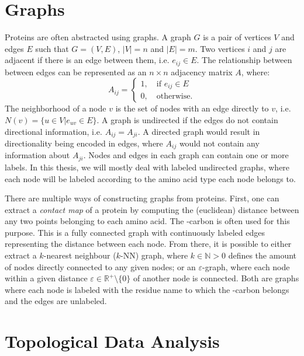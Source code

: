 \section{Graphs}\label{sec:graphs}

Proteins are often abstracted using graphs. A graph $G$ is a pair of vertices
$V$ and edges $E$ such that $G=(V, E)$, $|V|=n$ and $|E|=m$. Two vertices $i$
and $j$ are adjacent if there is an edge between them, i.e. $e_{ij}\in E$. The
relationship between between edges can be represented as an $n\times n$
adjacency matrix $A$, where:
\begin{equation}
  \label{eq:adjacency}
  A_{ij}=\begin{cases}
    1, \quad\text{if } e_{ij}\in E\\
    0, \quad\text{otherwise.}
  \end{cases}
\end{equation}
The neighborhood of a node $v$ is the set of nodes with an edge directly to $v$,
i.e. $N(v) = \{ u\in V|e_{uv} \in E \}$. A graph is undirected if the edges do
not contain directional information, i.e. $A_{ij}=A_{ji}$. A directed graph
would result in directionality being encoded in edges, where $A_{ij}$ would not
contain any information about $A_{ji}$. Nodes and edges in each graph can
contain one or more labels. In this thesis, we will mostly deal with labeled
undirected graphs, where each node will be labeled according to the amino acid
type each node belongs to.

There are multiple ways of constructing graphs from proteins. First, one can
extract a \emph{contact map} of a protein by computing the (euclidean) distance
between any two points belonging to each amino acid. The \textalpha-carbon is
often used for this purpose. This is a fully connected graph with continuously
labeled edges representing the distance between each node. From there, it is
possible to either extract a $k$-nearest neighbour ($k$-NN) graph, where
$k\in\mathbb{N}>0$ defines the amount of nodes directly connected to any given
nodes; or an $\varepsilon$-graph, where each node within a given distance
$\varepsilon\in\mathbb{R^+}\setminus \{0\}$ of another node is connected. Both
are graphs where each node is labeled with the residue name to which the
\textalpha{}-carbon belongs and the edges are unlabeled.

\section{Topological Data Analysis}\label{sec:tda}

